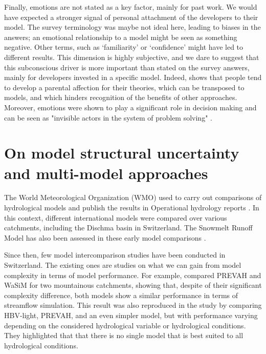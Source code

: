 \documentclass[10pt,a4paper]{article}
\begin{document}
Finally, emotions are not stated as a key factor, mainly for past work. We would have expected a stronger signal of personal attachment of the developers to their model. The survey terminology was maybe not ideal here, leading to biases in the answers; an emotional relationship to a model might be seen as something negative. Other terms, such as ‘familiarity’ or ‘confidence’ might have led to different results. This dimension is highly subjective, and we dare to suggest that this subconscious driver is more important than stated on the survey answers, mainly for developers invested in a specific model. Indeed, \citet{Chamberlin1890} shows that people tend to develop a parental affection for their theories, which can be transposed to models, and which hinders recognition of the benefits of other approaches. Moreover, emotions were shown to play a significant role in decision making and can be seen as "invisible actors in the system of problem solving" \citep{Hamalainen2015}.


\section{On model structural uncertainty and multi-model approaches}
\label{sec:multi-model}

The World Meteorological Organization (WMO) used to carry out comparisons of hydrological models and publish the results in Operational hydrology reports \citep{WMO1986, WMO1992a}. In this context, different international models were compared over various catchments, including the Dischma basin in Switzerland. The Snowmelt Runoff Model \citep[SRM,][see supplementary material]{Martinec1975} has also been assessed in these early model comparisons \citep{WMO1986, WMO1992a}.

Since then, few model intercomparison studies have been conducted in Switzerland. The existing ones are studies on what we can gain from model complexity in terms of model performance. For example, \citet{Gurtz2003} compared PREVAH and WaSiM for two mountainous catchments, showing that, despite of their significant complexity difference, both models show a similar performance in terms of streamflow simulation. This result was also reproduced in the study by \citet{Orth2015} comparing HBV-light, PREVAH, and an even simpler model, but with performance varying depending on the considered hydrological variable or hydrological conditions. They highlighted that that there is no single model that is best suited to all hydrological conditions.
\end{document}

